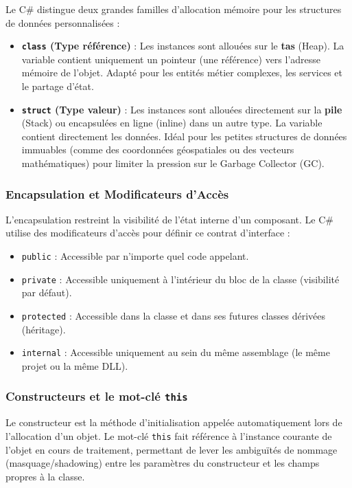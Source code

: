 Le C\# distingue deux grandes familles d'allocation mémoire pour les structures de données personnalisées :
\begin{itemize}
    \item \textbf{\texttt{class} (Type référence)} : Les instances sont allouées sur le \textbf{tas} (Heap). La variable contient uniquement un pointeur (une référence) vers l'adresse mémoire de l'objet. Adapté pour les entités métier complexes, les services et le partage d'état.
    \item \textbf{\texttt{struct} (Type valeur)} : Les instances sont allouées directement sur la \textbf{pile} (Stack) ou encapsulées en ligne (inline) dans un autre type. La variable contient directement les données. Idéal pour les petites structures de données immuables (comme des coordonnées géospatiales ou des vecteurs mathématiques) pour limiter la pression sur le Garbage Collector (GC).
\end{itemize}

\subsubsection{Encapsulation et Modificateurs d'Accès}

L'encapsulation restreint la visibilité de l'état interne d'un composant. Le C\# utilise des modificateurs d'accès pour définir ce contrat d'interface :
\begin{itemize}
    \item \texttt{public} : Accessible par n'importe quel code appelant.
    \item \texttt{private} : Accessible uniquement à l'intérieur du bloc de la classe (visibilité par défaut).
    \item \texttt{protected} : Accessible dans la classe et dans ses futures classes dérivées (héritage).
    \item \texttt{internal} : Accessible uniquement au sein du même assemblage (le même projet ou la même DLL).
\end{itemize}

\subsubsection{Constructeurs et le mot-clé \texttt{this}}

Le constructeur est la méthode d'initialisation appelée automatiquement lors de l'allocation d'un objet. Le mot-clé \texttt{this} fait référence à l'instance courante de l'objet en cours de traitement, permettant de lever les ambiguïtés de nommage (masquage/shadowing) entre les paramètres du constructeur et les champs propres à la classe.

